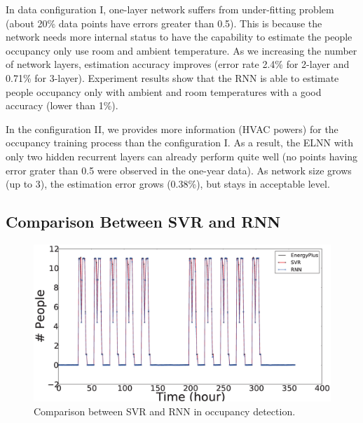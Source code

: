 In data configuration I, one-layer network suffers from under-fitting
problem (about 20\% data points have errors greater than 0.5). This is
because the network needs more internal status to have the capability
to estimate the people occupancy only use room and ambient
temperature.  As we increasing the number of network layers,
estimation accuracy improves (error rate 2.4\% for 2-layer and 0.71\%
for 3-layer). Experiment results show that the RNN is able to estimate
people occupancy only with ambient and room temperatures with a good
accuracy (lower than 1\%).

In the configuration II, we provides more information (HVAC powers)
for the occupancy training process than the configuration I. As a
result, the ELNN with only two hidden recurrent layers can
already perform quite well (no points having error grater than 0.5
were observed in the one-year data). As network size grows (up to 3),
the estimation error grows (0.38\%), but stays in acceptable level.

\subsection{Comparison Between SVR and RNN}
\begin{figure}[!h]
\centering
\includegraphics[width=5in]{./Pics/comparison.eps}
\caption{Comparison between SVR and RNN in occupancy detection.}
\label{fig:comparison}
\end{figure}

